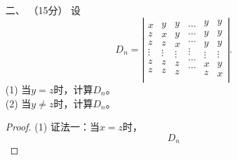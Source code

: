 \begin{enumerate}[1~]
\item[二、]（15分）
设\[
D_n=\left| \begin{array}{c}
	x\\
	z\\
	z\\
	\vdots\\
	z\\
	z\\
\end{array}\begin{array}{c}
	y\\
	x\\
	z\\
	\vdots\\
	z\\
	z\\
\end{array}\begin{array}{c}
	y\\
	y\\
	x\\
	\vdots\\
	z\\
	z\\
\end{array}\begin{array}{c}
	\cdots\\
	\cdots\\
	\cdots\\
	\vdots\\
	\cdots\\
	\cdots\\
\end{array}\begin{array}{c}
	y\\
	y\\
	y\\
	\vdots\\
	x\\
	z\\
\end{array}\begin{array}{c}
	y\\
	y\\
	y\\
	\vdots\\
	y\\
	x\\
\end{array} \right|.
\]
(1) 当$y=z$时，计算$D_n$。\\
(2) 当$y\ne z$时，计算$D_n$。
\begin{proof}
(1) 证法一：当$x=z$时，\[
D _ { n } 
\]
\end{proof}
\end{enumerate}
